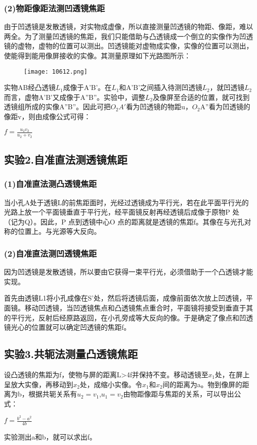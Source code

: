 \documentclass[11pt,a4paper,oneside]{article}
\begin{document}
\subsubsection*{(2)物距像距法测凹透镜焦距}
由于凹透镜是发散透镜，对实物成虚像，所以直接测量凹透镜的物距、像距，难以两全。为了测量凹透镜的焦距，我们只能借助与凸透镜成一个倒立的实像作为凹透镜的虚物，虚物的位置可以测出。凹透镜能对虚物成实像，实像的位置可以测出，使能得到能用像屏接收的实像。其测量原理如下光路图所示：

\begin{figure}[H]
 \centering
  \texttt{[image: 10612.png]}
\end{figure}

实物AB经凸透镜$L_1$成像于A'B'。在$L_1$和A'B'之间插入待测凹透镜$L_2$，就凹透镜$L_2$而言，虚物A'B'又成像于A''B''。实验中，调整$L_2$及像屏至合适的位置，就可找到透镜组所成的实像A''B''。因此可把$O_2A'$看为凹透镜的物距u，$O_2$A''看为凹透镜的像距v，则由成像公式可得：
\begin{center}
$f=\displaystyle\frac{{u_2}{v_2}}{{u_2}+{v_2}}$
\end{center}
\subsection*{实验2.自准直法测透镜焦距}

\subsubsection*{(1)自准直法测凸透镜焦距}
当小孔A处于透镜L的前焦距面时，光经过透镜成为平行光，若在此平面平行光的光路上放一个平面镜垂直于平行光，经平面镜反射再经透镜后成像于原物P 处（记为Q）。因此，P 点到透镜中心O 点的距离就是透镜的焦距f。其像在与光孔对称的位置上。与光源等大反向。
\subsubsection*{(2)自准直法测凹透镜焦距}
因为凹透镜是发散透镜，所以要由它获得一束平行光，必须借助于一个凸透镜才能实现。

首先由透镜L1将小孔成像在S’处，然后将透镜后面，成像前面依次放上凹透镜，平面镜。移动凹透镜，当凹透镜焦点和凸透镜焦点重合时，平面镜将接受到垂直于其的平行光，反射后经原路返回，在小孔旁成等大反向的像。于是确定了像点和凹透镜光心的位置就可以确定凹透镜的焦距f。
\subsection*{实验3.共轭法测量凸透镜焦距}
设凸透镜的焦距为f，使物与屏的距离L>4f并保持不变。移动透镜至$x_1$处，在屏上呈放大实像，再移动到$x_2$处，成缩小实像。令$x_1$和$x_2$间的距离为a。物到像屏的距离为b，根据共轭关系有$u_2=v_1$,$u_1=v_2$由物距像距与焦距的关系，可以导出公式：
\begin{center}
$f=\displaystyle\frac{b^{2}-a^{2}}{4b}$
\end{center}
实验测出a和b，就可以求出f。
\end{document}
